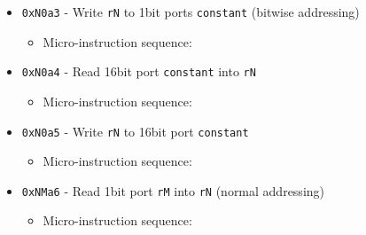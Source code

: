\documentclass{article}
\def\pkptrout{\Verb|0202| - output *\Verb|pk| to data bus}
\def\incrementpk{\Verb|0502| - increment \Verb|pk|}
\def\regtodata#1{\Verb|#1003| - output \Verb|r#1| to data bus}
\def\regtoaddr#1{\Verb|#1103| - output \Verb|r#1| to addr bus}
\def\datatoreg#1{\Verb|#1403| - write to \Verb|r#1| from data bus}
\def\echodataaddr{\Verb|0021| - echo data bus to addr bus for 3 cycles}
\def\readbitport  {\Verb|00a0| - read 1bit port \Verb|addr| (normal addressing) to the data line}
\def\writebitportb{\Verb|00a3| - write data line to 1bit port \Verb|addr| (bitwise addressing)}
\def\readwideport {\Verb|00a4| - read 16bit port \Verb|addr| to the data line}
\def\writewideport{\Verb|00a4| - write data line to 16bit port \Verb|addr|}
\def\done{\Verb|fffe| - end instruction}
\begin{document}
\begin{itemize}
    \item \Verb|0xN0a3| - Write \Verb|rN| to 1bit ports \Verb|constant| (bitwise addressing)
    \begin{itemize}
        \item Micro-instruction sequence:
    \end{itemize}

    \item \Verb|0xN0a4| - Read 16bit port \Verb|constant| into \Verb|rN|
    \begin{itemize}
        \item Micro-instruction sequence:
    \end{itemize}
    
    \item \Verb|0xN0a5| - Write \Verb|rN| to 16bit port \Verb|constant|
    \begin{itemize}
        \item Micro-instruction sequence:
    \end{itemize}

    \item \Verb|0xNMa6| - Read 1bit port \Verb|rM| into \Verb|rN| (normal addressing)
    \begin{itemize}
        \item Micro-instruction sequence:
    \end{itemize}
    

\end{itemize}
\end{document}
